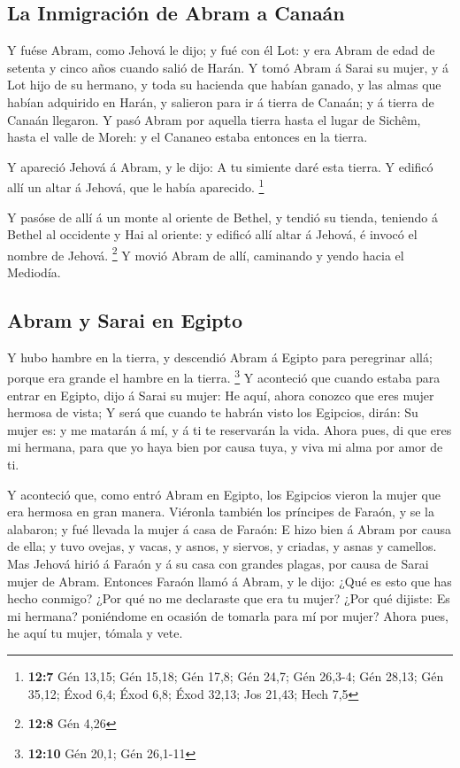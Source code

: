 \hypertarget{la-inmigraciuxf3n-de-abram-a-canauxe1n}{%
\subsection{La Inmigración de Abram a
Canaán}\label{la-inmigraciuxf3n-de-abram-a-canauxe1n}}

 Y fuése Abram, como Jehová le dijo; y fué con él Lot: y
era Abram de edad de setenta y cinco años cuando salió de Harán.
 Y tomó Abram á Sarai su mujer, y á Lot hijo de su
hermano, y toda su hacienda que habían ganado, y las almas que habían
adquirido en Harán, y salieron para ir á tierra de Canaán; y á tierra de
Canaán llegaron.  Y pasó Abram por aquella tierra hasta el
lugar de Sichêm, hasta el valle de Moreh: y el Cananeo estaba entonces
en la tierra.

 Y apareció Jehová á Abram, y le dijo: A tu simiente daré
esta tierra. Y edificó allí un altar á Jehová, que le había aparecido.
\footnote{\textbf{12:7} Gén 13,15; Gén 15,18; Gén 17,8; Gén 24,7; Gén
  26,3-4; Gén 28,13; Gén 35,12; Éxod 6,4; Éxod 6,8; Éxod 32,13; Jos
  21,43; Hech 7,5}

 Y pasóse de allí á un monte al oriente de Bethel, y
tendió su tienda, teniendo á Bethel al occidente y Hai al oriente: y
edificó allí altar á Jehová, é invocó el nombre de Jehová. \footnote{\textbf{12:8}
  Gén 4,26}  Y movió Abram de allí, caminando y yendo
hacia el Mediodía.

\hypertarget{abram-y-sarai-en-egipto}{%
\subsection{Abram y Sarai en Egipto}\label{abram-y-sarai-en-egipto}}

 Y hubo hambre en la tierra, y descendió Abram á Egipto
para peregrinar allá; porque era grande el hambre en la tierra.
\footnote{\textbf{12:10} Gén 20,1; Gén 26,1-11}  Y
aconteció que cuando estaba para entrar en Egipto, dijo á Sarai su
mujer: He aquí, ahora conozco que eres mujer hermosa de vista;
 Y será que cuando te habrán visto los Egipcios, dirán:
Su mujer es: y me matarán á mí, y á ti te reservarán la vida.
 Ahora pues, di que eres mi hermana, para que yo haya
bien por causa tuya, y viva mi alma por amor de ti.

 Y aconteció que, como entró Abram en Egipto, los
Egipcios vieron la mujer que era hermosa en gran manera. 
Viéronla también los príncipes de Faraón, y se la alabaron; y fué
llevada la mujer á casa de Faraón:  E hizo bien á Abram
por causa de ella; y tuvo ovejas, y vacas, y asnos, y siervos, y
criadas, y asnas y camellos.  Mas Jehová hirió á Faraón y
á su casa con grandes plagas, por causa de Sarai mujer de Abram.
 Entonces Faraón llamó á Abram, y le dijo: ¿Qué es esto
que has hecho conmigo? ¿Por qué no me declaraste que era tu mujer?
 ¿Por qué dijiste: Es mi hermana? poniéndome en ocasión
de tomarla para mí por mujer? Ahora pues, he aquí tu mujer, tómala y
vete.

